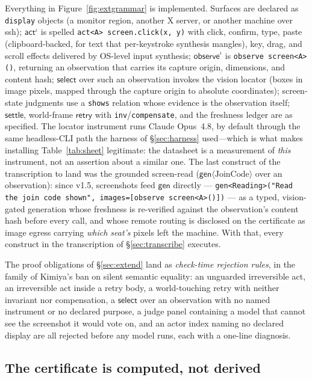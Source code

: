 \documentclass[acmsmall,screen,nonacm]{acmart}
\newcommand{\gen}{\mathsf{gen}}
\newcommand{\retry}{\mathsf{retry}}
\newcommand{\select}{\mathsf{select}}
\newcommand{\actc}{\mathsf{act}}
\newcommand{\observe}{\mathsf{observe}}
\newcommand{\settle}{\mathsf{settle}}
\theoremstyle{acmdefinition}%
\theoremstyle{acmplain}%
\begin{document}
Everything in Figure~\ref{fig:extgrammar} is implemented. Surfaces are
declared as \texttt{display} objects (a monitor region, another X
server, or another machine over ssh); $\actc^{\iota}$ is spelled
\texttt{act<A> screen.click(x,\,y)} with click, confirm, type, paste
(clipboard-backed, for text that per-keystroke synthesis mangles), key,
drag, and scroll effects delivered by OS-level input synthesis;
$\observe^{\iota}$ is \texttt{observe screen<A>()}, returning an
observation that carries its capture origin, dimensions, and content
hash; $\select$ over such an observation invokes the vision locator
(boxes in image pixels, mapped through the capture origin to absolute
coordinates); screen-state judgments use a \texttt{shows} relation whose
evidence is the observation itself; $\settle$, world-frame $\retry$ with
\texttt{inv}/\texttt{compensate}, and the freshness ledger are as
specified. The locator instrument runs Claude Opus~4.8, by default
through the same headless-CLI path the harness of \S\ref{sec:harness}
used---which is what makes installing Table~\ref{tab:sheet} legitimate:
the datasheet is a measurement of \emph{this} instrument, not an
assertion about a similar one. The last construct of the transcription
to land was the grounded screen-read
($\gen\langle\text{JoinCode}\rangle$ over an observation): since
v1.5, screenshots feed $\gen$ directly ---
\texttt{gen<Reading>("Read the join code shown",
images=[observe screen<A>()])} --- as a typed, vision-gated generation
whose freshness is re-verified against the observation's content hash
before every call, and whose remote routing is disclosed on the
certificate as image egress carrying \emph{which seat's} pixels left
the machine. With that, every construct in the transcription of
\S\ref{sec:transcribe} executes.

The proof obligations of \S\ref{sec:extend} land as \emph{check-time
rejection rules}, in the family of Kimiya's ban on silent semantic
equality: an unguarded irreversible act, an irreversible act inside a
retry body, a world-touching retry with neither invariant nor
compensation, a $\select$ over an observation with no named instrument
or no declared purpose, a judge panel containing a model that cannot see
the screenshot it would vote on, and an actor index naming no declared
display are all rejected before any model runs, each with a one-line
diagnosis.

\subsection{The certificate is computed, not derived}
\end{document}
